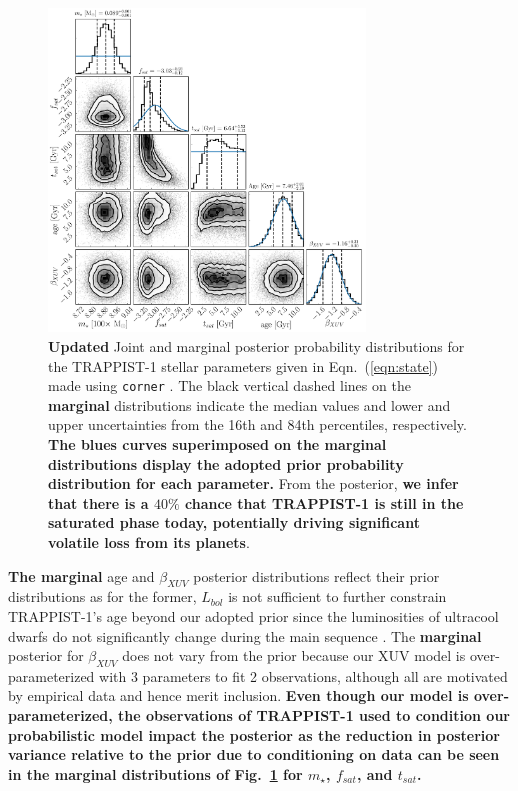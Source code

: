\documentclass[twocolumn]{aastex62}
\newcommand{\xxx}[1]{{\textbf{#1}}}
\begin{document}
\begin{figure}[t]
\centering
	\includegraphics[width=0.75\textwidth]{../Analysis/Corner/trappist1Corner.pdf}
   \caption{\xxx{Updated} Joint and marginal posterior probability distributions for the TRAPPIST-1 stellar parameters given in Eqn.~(\ref{eqn:state}) made using \texttt{corner} \citep{ForemanMackey2016}. The black vertical dashed lines on the \xxx{marginal} distributions indicate the median values and lower and upper uncertainties from the 16th and 84th percentiles, respectively. \xxx{The blues curves superimposed on the marginal distributions display the adopted prior probability distribution for each parameter.} From the posterior, \xxx{we infer that there is a $40\%$ chance that TRAPPIST-1 is still in the saturated phase today, potentially driving significant volatile loss from its planets}.}%
    \label{fig:corner}%
\end{figure}

\xxx{The marginal} age and $\beta_{XUV}$ posterior distributions reflect their prior distributions as for the former, $L_{bol}$ is not sufficient to further constrain TRAPPIST-1's age beyond our adopted prior since the luminosities of ultracool dwarfs do not significantly change during the main sequence \citep{Baraffe2015}. The \xxx{marginal} posterior for $\beta_{XUV}$ does not vary from the prior because our XUV model is over-parameterized with 3 parameters to fit 2 observations, although all are motivated by empirical data and hence merit inclusion. \xxx{Even though our model is over-parameterized, the observations of TRAPPIST-1 used to condition our probabilistic model impact the posterior as the reduction in posterior variance relative to the prior due to conditioning on data can be seen in the marginal distributions of Fig.~\ref{fig:corner} for $m_{\star}$, $f_{sat}$, and $t_{sat}$.}
\end{document}
